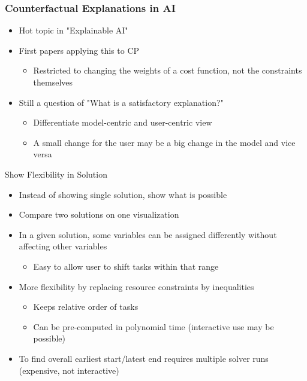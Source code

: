 \documentclass[dvipsnames,aspectratio=169]{beamer}
\begin{document}
\begin{frame}
\frametitle{Counterfactual Explanations in AI}
\begin{itemize}
\item Hot topic in "Explainable AI" \cite{DBLP:journals/access/StepinACP21,DBLP:journals/corr/abs-2010-10596}
\item First papers applying this to CP \cite{Korikov2021} \cite{DBLP:conf/ijcai/KorikovSB21}
\begin{itemize}
    \item Restricted to changing the weights of a cost function, not the constraints themselves
\end{itemize}
\item Still a question of "What is a satisfactory explanation?"
\begin{itemize}
    \item Differentiate model-centric and user-centric view
    \item A small change for the user may be a big change in the model and vice versa
\end{itemize}
\end{itemize}
\end{frame}

\begin{frame}{Show Flexibility in Solution}
\begin{itemize}
    \item Instead of showing single solution, show what is possible
    \item Compare two solutions on one visualization
    \item In a given solution, some variables can be assigned differently without affecting other variables
    \begin{itemize}
        \item Easy to allow user to shift tasks within that range
    \end{itemize}
    \item More flexibility by replacing resource constraints by inequalities
    \begin{itemize}
    \item Keeps relative order of tasks
    \item Can be pre-computed in polynomial time (interactive use may be possible)
    \end{itemize}
    \item To find overall earliest start/latest end requires multiple solver runs (expensive, not interactive)
\end{itemize}
\end{frame}
\end{document}
